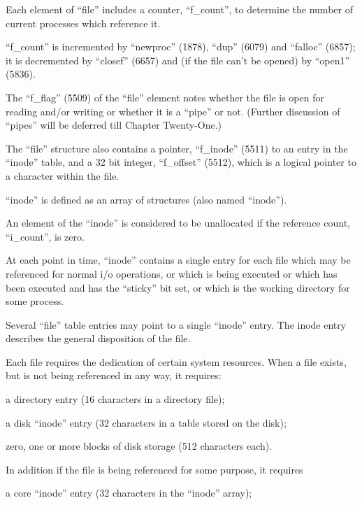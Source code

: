 Each element of ``file'' includes a
counter, ``f\_count'', to determine the
number of current processes which
reference it.

``f\_count'' is incremented by ``newproc''
(1878), ``dup'' (6079) and ``falloc''
(6857); it is decremented by ``closef''
(6657) and (if the file can't be
opened) by ``open1'' (5836).

The ``f\_flag'' (5509) of the ``file'' element notes whether the file is open for
reading and/or writing or whether it is
a ``pipe'' or not. (Further discussion of
``pipes'' will be deferred till Chapter
Twenty-One.)

The ``file'' structure also contains a
pointer, ``f\_inode'' (5511) to an entry
in the ``inode'' table, and a 32 bit
integer, ``f\_offset'' (5512), which is a
logical pointer to a character within
the file.



``inode'' is defined as an array of
structures (also named ``inode'').


An element of the ``inode''
is considered to be unallocated if the reference
count, ``i\_count'', is zero.

At each point in time, ``inode'' contains
a single entry for each file which may
be referenced for normal i/o operations, or which is being executed or
which has been executed and has the
``sticky'' bit set, or which is the working directory for some process.


Several ``file'' table entries may point
to a single ``inode'' entry. The inode
entry describes the general disposition
of the file.


Each file requires the dedication of
certain system resources. When a file
exists, but is not being referenced in
any way, it requires:

\bd
\item[(a)] a directory entry (16 characters
 in a directory file);

\item[(b)] a disk ``inode'' entry (32 characters in a table stored on the
disk);

\item[(c)] zero, one or more blocks of disk
 storage (512 characters each).
\ed


\noindent In addition if the file is being referenced for some purpose, it requires

\bd
\item[(d)] a core ``inode'' entry (32 characters in the ``inode'' array);
\ed


